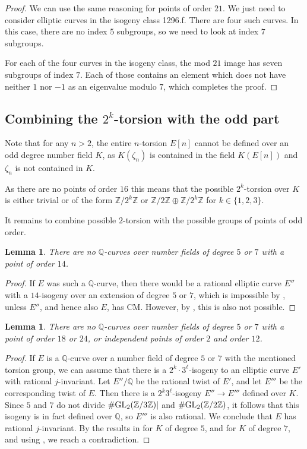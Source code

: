 \documentclass[10pt,leqno]{amsart}
\newcommand{\Z}{\mathbb{Z}}
\newcommand{\Q}{\mathbb{Q}}
\newcommand{\GL}{\textnormal{GL}}
\newtheorem{lemma}[theorem]{Lemma}
\theoremstyle{definition}
\theoremstyle{remark}
\numberwithin{theorem}{section}
\begin{document}
\begin{proof}
We can use the same reasoning for points of order $21$. We just need to consider elliptic curves in the isogeny class 1296.f. There are four such curves. In this case, there are no index $5$ subgroups, so we need to look at index $7$ subgroups.

For each of the four curves in the isogeny class, the mod $21$ image has seven subgroups of index $7$. Each of those contains an element which does not have neither $1$ nor $-1$ as an eigenvalue modulo $7$, which completes the proof.
\end{proof}

\subsection{Combining the $2^k$-torsion with the odd part}

Note that for any $n>2$, the entire $n$-torsion $E[n]$ cannot be defined over an odd degree number field $K$, as $K(\zeta_n)$ is contained in the field $K(E[n])$ and $\zeta_n$ is not contained in $K$.

As there are no points of order $16$ this means that the possible $2^k$-torsion over $K$ is either trivial or of the form $\Z/2^k\Z$ or $\Z/2\Z\oplus \Z/2^k\Z$ for $k \in \{1,2,3\}$.

It remains to combine possible $2$-torsion with the possible groups of points of odd order.  


\begin{lemma}
    There are no $\Q$-curves over number fields of degree $5$ or $7$ with a point of order $14$.
\end{lemma}
\begin{proof}
      If $E$ was such a $\Q$-curve, then there would be a rational elliptic curve $E''$ with a $14$-isogeny over an extension of degree $5$ or $7$, which is impossible by \cite[Theorem 1.3]{ja}, unless $E''$, and hence also $E$, has CM. However, by \cite[5.5 and 5.7]{CMcase}, this is also not possible.
\end{proof}

\begin{lemma}
    There are no $\Q$-curves over number fields of degree $5$ or $7$ with a point of order $18$ or $24$, or independent points of order $2$ and order $12$.
\end{lemma}
\begin{proof}
    If $E$ is a $\Q$-curve over a number field of degree $5$ or $7$ with the mentioned torsion group, we can assume that there is a $2^k\cdot 3^\ell$-isogeny to an elliptic curve $E'$ with rational $j$-invariant. Let $E''/\Q$ be the rational twist of $E'$, and let $E'''$ be the corresponding twist of $E$. Then there is a $2^k3^\ell$-isogeny $E'' \to E'''$ defined over $K$. Since $5$ and $7$ do not divide $\#\GL_2(\Z/3\Z)|$ and $\#\GL_2(\Z/2\Z)$, it follows that this isogeny is in fact defined over $\Q$, so $E'''$ is also rational. We conclude that $E$ has rational $j$-invariant. By the results in \cite{alvaro-quintic} for $K$ of degree $5$, and \cite{basechanges} for $K$ of degree $7$, and using \cite[Theorem 5.1.2]{guzvic2021torsion}, we reach a contradiction.
\end{proof}
\end{document}
